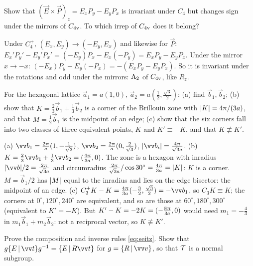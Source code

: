 \exercisesection

\begin{exercise}\label{ex:6:C4v}
Show that $(\vec{E}\times\vec{P})_z=E_xP_y-E_yP_x$ is invariant under $C_4$ but changes
sign under the mirrors of $C_{4\mathrm{v}}$. To which irrep of $C_{4\mathrm{v}}$ does it belong?
\end{exercise}

\begin{solution}
Under $C_4^+$, $(E_x,E_y)\to(-E_y,E_x)$ and likewise for $\vec{P}$:
$E_x'P_y'-E_y'P_x'=(-E_y)P_x-E_x(-P_y)=E_xP_y-E_yP_x$. Under the mirror
$x\to-x$: $(-E_x)P_y-E_y(-P_x)=-(E_xP_y-E_yP_x)$. So it is invariant under the rotations
and odd under the mirrors: $\mathrm{A}_2$ of $C_{4\mathrm{v}}$, like $R_z$.
\end{solution}

\begin{exercise}\label{ex:6:recip}
For the hexagonal lattice $\vec{a}_1=a(1,0)$, $\vec{a}_2=a(\tfrac12,\tfrac{\sqrt3}{2})$:
(a) find $\vec{b}_1,\vec{b}_2$; (b) show that $K=\tfrac23\vec{b}_1+\tfrac13\vec{b}_2$ is a
corner of the Brillouin zone with $\lvert K\rvert=4\uppi/(3a)$, and that $M=\tfrac12\vec{b}_1$ is
the midpoint of an edge; (c) show that the six corners fall into two classes of three
equivalent points, $K$ and $K'\equiv-K$, and that $K\not\equiv K'$.
\end{exercise}

\begin{solution}
(a) $\vec{b}_1=\tfrac{2\cpi}{a}(1,-\tfrac{1}{\sqrt3})$, $\vec{b}_2=\tfrac{2\cpi}{a}(0,\tfrac{2}{\sqrt3})$,
$\abs{\vec{b}_i}=\tfrac{4\cpi}{\sqrt3a}$.
(b) $K=\tfrac23\vec{b}_1+\tfrac13\vec{b}_2=(\tfrac{4\cpi}{3a},0)$. The zone is a hexagon with
inradius $\abs{\vec{b}}/2=\tfrac{2\cpi}{\sqrt3a}$ and circumradius
$\tfrac{2\uppi}{\sqrt3a}/\cos30^\circ=\tfrac{4\uppi}{3a}=\lvert K\rvert$: $K$ is a corner. $M=\vec{b}_1/2$
has $\lvert M\rvert$ equal to the inradius and lies on the edge bisector: the midpoint of an
edge.
(c) $C_3^+K-K=\tfrac{4\cpi}{3a}(-\tfrac32,\tfrac{\sqrt3}{2})=-\vec{b}_1$, so $C_3K\equiv K$; the
corners at $0^\circ,120^\circ,240^\circ$ are equivalent, and so are those at
$60^\circ,180^\circ,300^\circ$ (equivalent to $K'=-K$). But $K'-K=-2K=(-\tfrac{8\uppi}{3a},0)$
would need $m_1=-\tfrac43$ in $m_1\vec{b}_1+m_2\vec{b}_2$: not a reciprocal vector, so
$K\not\equiv K'$.
\end{solution}

\begin{exercise}\label{ex:6:seitz}
Prove the composition and inverse rules \eqref{eq:seitz}. Show that
$g\seitz{E}{\vec{t}}g^{-1}=\seitz{E}{R\vec{t}}$ for $g=\seitz{R}{\vec{v}}$, so that
$\mathcal{T}$ is a normal subgroup.
\end{exercise}

